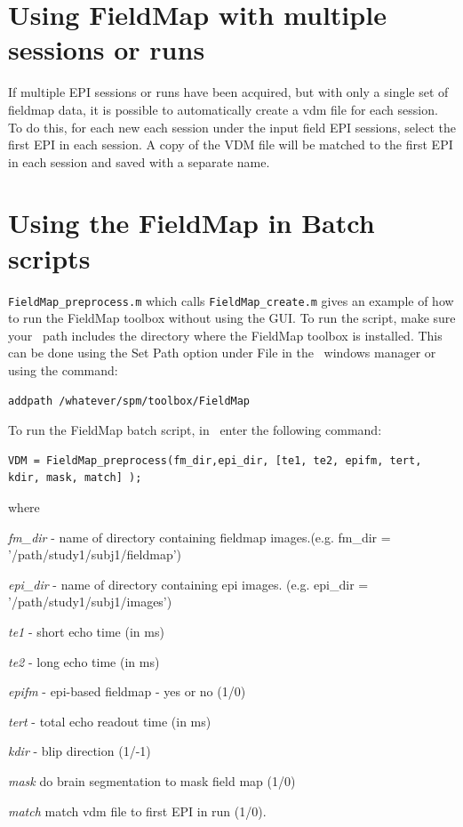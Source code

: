 \section{Using FieldMap with multiple sessions or runs}
If multiple EPI sessions or runs have been acquired, but with only a single set of fieldmap data, it is possible to automatically create a vdm file for each session. To do this, for each new each session under the input field EPI sessions, select the first EPI in each session. A copy of the VDM file will be matched to the first EPI in each session and saved with a separate name.

\section{Using the FieldMap in Batch scripts}
\texttt{FieldMap\_preprocess.m} which calls \texttt{FieldMap\_create.m} gives an example of how to run the FieldMap toolbox without using the GUI. To run the script, make sure your \matlab\ path includes the directory where the FieldMap toolbox is installed. This can be done using the Set Path option under File in the \matlab\ windows manager or using the command: 
\begin{verbatim}
addpath /whatever/spm/toolbox/FieldMap
\end{verbatim}

To run the FieldMap batch script, in \matlab\ enter the following command: 
\begin{verbatim}
VDM = FieldMap_preprocess(fm_dir,epi_dir, [te1, te2, epifm, tert, kdir, mask, match] );
\end{verbatim}
where

\emph{fm\_dir} - name of directory containing fieldmap images.(e.g. fm\_dir = '/path/study1/subj1/fieldmap') 

\emph{epi\_dir} - name of directory containing epi images. (e.g. epi\_dir = '/path/study1/subj1/images')

\emph{te1} - short echo time (in ms)

\emph{te2} - long echo time (in ms)

\emph{epifm} - epi-based fieldmap - yes or no (1/0)

\emph{tert} - total echo readout time (in ms)

\emph{kdir} - blip direction (1/-1)

\emph{mask} do brain segmentation to mask field map (1/0)

\emph{match} match vdm file to first EPI in run (1/0).



